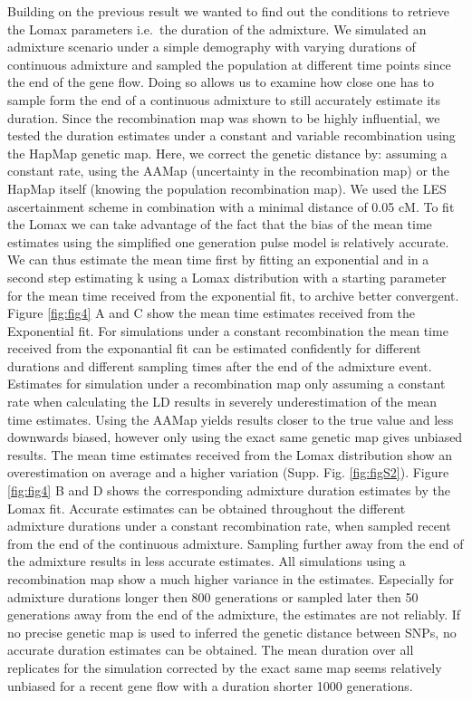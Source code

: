 \documentclass[]{article}
\begin{document}
Building on the previous
result we wanted to find out the conditions to retrieve the Lomax
parameters i.e.~the duration of the admixture. We simulated an admixture
scenario under a simple demography with varying durations of continuous
admixture and sampled the population at different time points since the
end of the gene flow. Doing so allows us to examine how close one has to
sample form the end of a continuous admixture to still accurately
estimate its duration. Since the recombination map was shown to be highly
influential, we tested the duration estimates under a constant and variable
recombination using the HapMap genetic map. Here, we correct the
genetic distance by: assuming a constant rate, using the AAMap (uncertainty in the recombination map) or the
HapMap itself (knowing the population recombination map). We used the LES ascertainment scheme in combination with
a minimal distance of 0.05 cM. To fit the Lomax we can take advantage of
the fact that the bias of the mean time estimates using the simplified
one generation pulse model is relatively accurate. We can thus estimate
the mean time first by fitting an exponential and in a second step estimating k
using a Lomax distribution with a starting parameter for the mean time received
from the exponential fit, to archive better convergent. Figure \ref{fig:fig4} A and C show the mean
time estimates received from the Exponential fit. For simulations under a
constant recombination the mean time received from the exponantial fit can be estimated confidently for different durations and different sampling times after the end of the admixture event. Estimates for simulation under a recombination map only
assuming a constant rate when calculating the LD results in severely
underestimation of the mean time estimates. Using the AAMap yields
results closer to the true value and less downwards biased, however only
using the exact same genetic map gives unbiased results. The mean time estimates received from the Lomax distribution show an overestimation on average and a higher variation (Supp. Fig.  \ref{fig:figS2}).  Figure
\ref{fig:fig4} B and D shows the corresponding admixture duration estimates by the
Lomax fit. Accurate estimates can be obtained throughout the different
admixture durations under a constant recombination rate, when sampled
recent from the end of the continuous admixture. Sampling further away from the end of the admixture results in less accurate estimates.  All simulations using a recombination map show a much higher
variance in the estimates. Especially for admixture durations longer then
800 generations or sampled later then 50 generations away from the end
of the admixture, the estimates are not reliably. If no precise genetic map
is used to inferred the genetic distance between SNPs, no accurate
duration estimates can be obtained. The mean duration over all
replicates for the simulation corrected by the exact same map seems
relatively unbiased for a recent gene flow with a duration shorter 1000
generations. 
\end{document}
